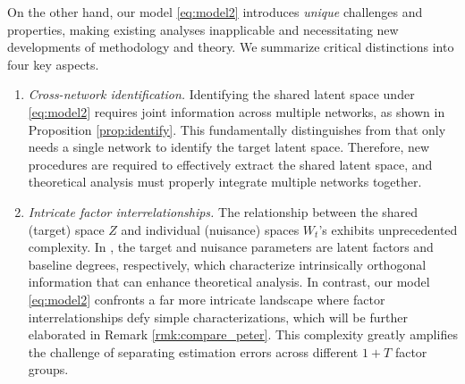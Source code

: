 \documentclass[12pt]{article}
\begin{document}
\noindent On the other hand, our model \eqref{eq:model2} introduces \textit{unique}  challenges and properties, 
making existing analyses 
inapplicable and necessitating new developments of methodology and theory. We summarize  critical distinctions into four key aspects. \vspace{-5pt}
\begin{enumerate}[leftmargin=17pt]
\setlength{\itemsep}{0pt} 
\item \textit{Cross-network identification.} Identifying the shared latent space  under \eqref{eq:model2} requires joint information across multiple  networks, as shown in Proposition \ref{prop:identify}. This fundamentally distinguishes from \cite{he2023semiparametric} that only needs a single network to identify the target latent space. 
Therefore, new procedures are required to effectively extract the shared latent space, and  theoretical analysis must properly integrate multiple networks together. 
\item \textit{Intricate factor interrelationships.} The relationship between the shared (target) space $Z$ and individual (nuisance) spaces $W_t$'s exhibits unprecedented complexity. 
In  \cite{he2023semiparametric}, 
the target and nuisance parameters are 
 latent factors and baseline degrees, respectively,
which  characterize intrinsically orthogonal  information that can enhance theoretical analysis. 
In contrast, our model \eqref{eq:model2} confronts a far more intricate landscape where factor interrelationships defy simple characterizations, which will be further elaborated in Remark \ref{rmk:compare_peter}. 
This complexity greatly amplifies the  challenge of separating estimation errors across different $1+T$ factor groups.

\end{enumerate}
\end{document}

